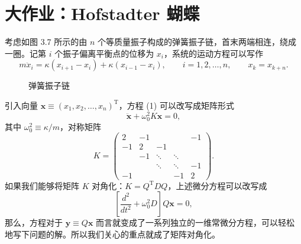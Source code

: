 \section*{大作业：Hofstadter 蝴蝶}

考虑如图 3.7 所示的由 $n$ 个等质量振子构成的弹簧振子链，首末两端相连，绕成一圈。记第 $i$ 个振子偏离平衡点的位移为 $x_i$，系统的运动方程可以写作
\begin{equation}
m\ddot x_i=\kappa(x_{i+1}-x_i)+\kappa(x_{i-1}-x_i),\qquad i=1,2,\ldots,n,
\qquad x_k=x_{k+n}.
\tag{1}
\end{equation}

\begin{figure}[htbp]
\centering
{}
\caption{弹簧振子链}
\label{fig:spring-chain}
\end{figure}

引入向量 $\bm x\equiv(x_1,x_2,\ldots,x_n)^{\mathrm T}$，方程 (1) 可以改写成矩阵形式
\begin{equation}
\ddot{\bm x}+\omega_0^2K\bm x=0,
\tag{2}
\end{equation}
其中 $\omega_0^2\equiv\kappa/m$，对称矩阵
\begin{equation}
K=
\begin{pmatrix}
2&-1&&&-1\\
-1&2&-1&&\\
&-1&\ddots&\ddots&\\
&&\ddots&\ddots&-1\\
-1&&&-1&2
\end{pmatrix}.
\tag{3}
\end{equation}
如果我们能够将矩阵 $K$ 对角化：$K=Q^{\mathrm T}DQ$，上述微分方程可以改写成
\begin{equation}
\left[\frac{d^2}{dt^2}+\omega_0^2D\right]Q\bm x=0,
\tag{4}
\end{equation}
那么，方程对于 $\bm y\equiv Q\bm x$ 而言就变成了一系列独立的一维常微分方程，可以轻松地写下问题的解。所以我们关心的重点就成了矩阵对角化。

